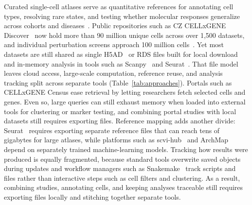 \documentclass[11pt]{article}
\begin{document}
Curated single-cell atlases serve as quantitative references for annotating cell types, resolving rare states, and testing whether molecular responses generalize across cohorts and diseases~\cite{lotfollahi2024mapping}. Public repositories such as CZ CELLxGENE Discover~\cite{cellxgene2025} now hold more than 90 million unique cells across over 1,500 datasets, and individual perturbation screens approach 100 million cells~\cite{zhang2026tahoe100m}. Yet most datasets are still shared as single H5AD~\cite{virshup2024} or RDS files built for local download and in-memory analysis in tools such as Scanpy~\cite{wolf2018} and Seurat~\cite{hao2024seurat}. That file model leaves cloud access, large-scale computation, reference reuse, and analysis tracking split across separate tools (Table~\ref{tab:approaches}). Portals such as CELLxGENE Census ease retrieval by letting researchers fetch selected cells and genes. Even so, large queries can still exhaust memory when loaded into external tools for clustering or marker testing, and combining portal studies with local datasets still requires exporting files. Reference mapping adds another divide: Seurat~\cite{hao2021} requires exporting separate reference files that can reach tens of gigabytes for large atlases, while platforms such as scvi-hub~\cite{scvihub2025} and ArchMap~\cite{lotfollahi2026archmap} depend on separately trained machine-learning models. Tracking how results were produced is equally fragmented, because standard tools overwrite saved objects during updates and workflow managers such as Snakemake~\cite{molder2021snakemake} track scripts and files rather than interactive steps such as cell filters and clustering. As a result, combining studies, annotating cells, and keeping analyses traceable still requires exporting files locally and stitching together separate tools.
\end{document}
